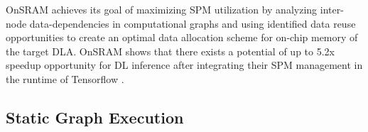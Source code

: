 

OnSRAM achieves its goal of maximizing SPM utilization by analyzing inter-node
data-dependencies in computational graphs and using identified data reuse opportunities
to create an optimal data allocation scheme for on-chip memory of the target DLA. OnSRAM
shows that there exists a potential of up to 5.2x speedup opportunity for DL inference
after integrating their SPM management in the runtime of Tensorflow \cite{onsram}.


\subsection{Static Graph Execution}



